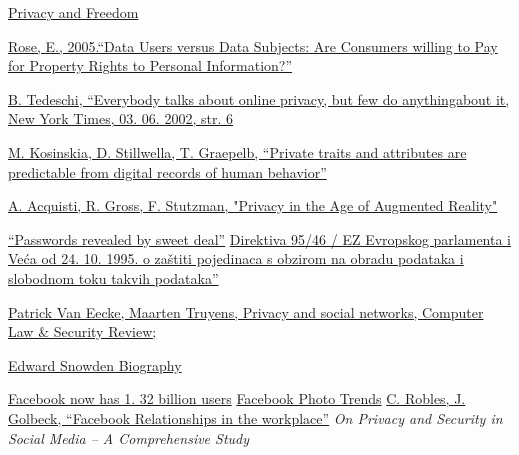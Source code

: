 \documentclass[a4paper]{article}
\begin{document}
\begin{thebibliography}{11}

 \href{https://scholarlycommons.law.wlu.edu/wlulr/vol25/iss1/20/}{Privacy and Freedom}

\href{https://ieeexplore.ieee.org/document/1385600}{ Rose, E., 2005.“Data Users versus Data Subjects: Are Consumers willing to Pay for Property Rights to Personal Information?”}

\href{https://www.nytimes.com/2002/06/03/business/e-commerce-report-everybody-talks-about-online-privacy-but-few-anything-about-it.html}{B. Tedeschi, “Everybody talks about online privacy, but few do anythingabout it, New York Times, 03. 06. 2002, str. 6}

\href{https://www. pnas. org/doi/10. 1073/pnas. 1218772110}
{M. Kosinskia, D. Stillwella, T. Graepelb, “Private traits and attributes are predictable from digital records of human behavior”}

\href{https://www.heinz.cmu.edu/~acquisti/papers/AcquistiGrossStutzman-JPC-2014.pdf}
{A. Acquisti, R. Gross, F. Stutzman, "Privacy in the Age of Augmented Reality"}

 \href{http://news.bbc.co.uk/2/hi/technology/3639679.stm}{“Passwords revealed by sweet deal”}
 \href{https://eur-lex.europa.eu/legal-content/EN/TXT/HTML/?uri=CELEX:31995L0046&from=en}{Direktiva 95/46 / EZ Evropskog parlamenta i Veća od 24. 10. 1995. o
zaštiti pojedinaca s obzirom na obradu podataka i slobodnom
toku takvih podataka”}

 \href{https://www.sciencedirect.com/science/article/abs/pii/S0267364910001093}{Patrick Van Eecke, Maarten Truyens, Privacy and social networks, Computer Law \& Security Review;}


 \href{https://www.britannica.com/biography/Edward-Snowden}{Edward Snowden Biography}

 \href{https://www.dailymail.co.uk/sciencetech/article-2703440/Theres-no-escape-Facebook-set-record-stock-high-results-beats-expectations-1-32-BILLION-users-30-mobile.html}{Facebook now has 1. 32 billion users}
 \href{http://blog.pixable.com//2011/02/14/facebook-photo-trends-inphographic}{Facebook Photo Trends}
 \href{https://ischool.umd.edu/wp-content/uploads/tenure-cv-Jennifer-Ann-Golbec.pdf}{C. Robles, J. Golbeck, “Facebook Relationships in the workplace”}
 \emph{On Privacy and Security in Social Media – A Comprehensive Study}

\end{thebibliography}
\end{document}
